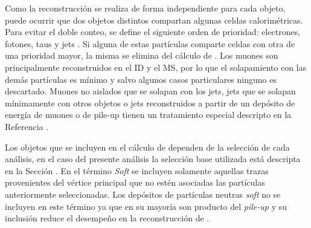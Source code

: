 Como la reconstrucción se realiza de forma independiente para cada objeto, puede ocurrir que dos objetos distintos compartan algunas celdas calorimétricas. Para evitar el doble conteo, se define el siguiente orden de prioridad: electrones, fotones, taus y jets \cite{PERF-2011-07, PERF-2014-04}. Si alguna de estas partículas comparte celdas con otra de una prioridad mayor, la misma se elimina del cálculo de \met. Los muones son principalmente reconstruidos en el ID y el MS, por lo que el solapamiento con las demás partículas es mínimo y salvo algunos casos particulares ninguno es descartado. Muones no aislados que se solapan con los jets, jets que se solapan mínimamente con otros objetos o jets reconstruidos a partir de un depósito de energía de muones o de pile-up tienen un tratamiento especial descripto en la Referencia \cite{PERF-2016-07}.

Los objetos que se incluyen en el cálculo de \met dependen de la selección de cada análisis, en el caso del presente análisis la selección base utilizada está descripta en la Sección . En el término \textit{Soft} se incluyen solamente aquellas trazas provenientes del vértice principal que no estén asociadas las partículas anteriormente seleccionadas. Los depósitos de partículas neutras \textit{soft} no se incluyen en este término ya que en su mayoría son producto del \textit{pile-up} y su inclusión reduce el desempeño en la reconstrucción de \met. 


